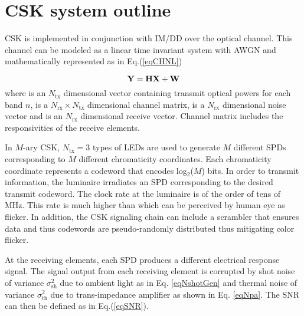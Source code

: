 \graphicspath{{_MIMOColor/figures_csk/}}

\section{CSK system outline}
\label{sec:cskOutline}
CSK is implemented in conjunction with IM/DD over the optical channel. This channel can be modeled as a linear time invariant system with AWGN and mathematically represented as in Eq.(\ref{eqCHNL})

\begin{equation}
	{\bf{Y}} = {\bf{H}}{\bf{X}} + {\bf{W}}
	\label{eqCHNL}
\end{equation}
where  is an $N_{\text{tx}}$ dimensional vector containing transmit optical powers for each band $n$,  is a $N_{\text{rx}}\times N_{\text{tx}}$ dimensional channel matrix,  is a $N_{\text{rx}}$ dimensional noise vector and  is an $N_{\text{rx}}$ dimensional receive vector. Channel matrix  includes the responsivities of the receive elements.

In $M$-ary CSK, $N_{\text{tx}}=3$ types of LEDs are used to generate $M$ different SPDs corresponding to $M$ different chromaticity coordinates. Each chromaticity coordinate represents a codeword that encodes log$^{ }_{2}$($M$) bits. In order to transmit information, the luminaire irradiates an SPD corresponding to the desired transmit codeword. The clock rate at the luminaire is of the order of tens of MHz. This rate is much higher than which can be perceived by human eye as flicker. In addition, the CSK signaling chain can include a scrambler that ensures data and thus codewords are pseudo-randomly distributed thus mitigating color flicker.

At the receiving elements, each SPD produces a different electrical response signal. The signal output from each receiving element is corrupted by shot noise of variance $\sigma^{2}_{\text{sh}}$ due to ambient light as in Eq. \eqref{eqNshotGen} and thermal noise of variance $\sigma^{2}_{\text{th}}$ due to trans-impedance amplifier as shown in Eq. \eqref{eqNpa}. The SNR can then be defined as in Eq.(\ref{eqSNR}).


